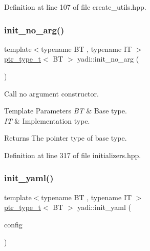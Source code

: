 Definition at line 107 of file create\+\_\+utils.\+hpp.

\mbox{\label{namespaceyadi_a29e6a880477f8ed0163fbfc66aa6e5ba}} 
\subsubsection{\texorpdfstring{init\+\_\+no\+\_\+arg()}{init\_no\_arg()}}
{\footnotesize\ttfamily template$<$typename BT , typename IT $>$ \\
\hyperlink{namespaceyadi_a92290eb27cd90666aa87b17d854af9fe}{ptr\+\_\+type\+\_\+t}$<$ BT $>$ yadi\+::init\+\_\+no\+\_\+arg (\begin{DoxyParamCaption}\item[{Y\+A\+M\+L\+::\+Node const \&}]{ }\end{DoxyParamCaption})}



Call no argument constructor. 


\begin{DoxyTemplParams}{Template Parameters}
{\em BT} & Base type. \\
\hline
{\em IT} & Implementation type. \\
\hline
\end{DoxyTemplParams}
\begin{DoxyReturn}{Returns}
The pointer type of base type. 
\end{DoxyReturn}


Definition at line 317 of file initializers.\+hpp.

\mbox{\label{namespaceyadi_afde7bc09c5c23344ded1f10f21386272}} 
\subsubsection{\texorpdfstring{init\+\_\+yaml()}{init\_yaml()}}
{\footnotesize\ttfamily template$<$typename BT , typename IT $>$ \\
\hyperlink{namespaceyadi_a92290eb27cd90666aa87b17d854af9fe}{ptr\+\_\+type\+\_\+t}$<$ BT $>$ yadi\+::init\+\_\+yaml (\begin{DoxyParamCaption}\item[{Y\+A\+M\+L\+::\+Node const \&}]{config }\end{DoxyParamCaption})}



